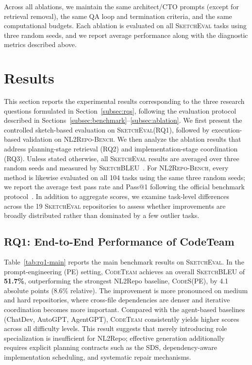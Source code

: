 \documentclass[format=acmsmall, review=false, screen=true]{acmart}
\newcommand{\tool}{\textsc{CodeTeam}\xspace}
\newcommand{\codes}{\textsc{CodeS}\xspace}
\newcommand{\sketcheval}{\textsc{SketchEval}\xspace}
\newcommand{\sketchbleu}{\textsc{SketchBLEU}\xspace}
\newcommand{\nlrepobench}{\textsc{NL2Repo-Bench}\xspace}
\begin{document}
Across all ablations, we maintain the same architect/CTO prompts (except for retrieval removal), the same QA loop and termination criteria, and the same computational budgets. Each ablation is evaluated on all \sketcheval tasks using three random seeds, and we report average performance along with the diagnostic metrics described above.


\section{Results}
\label{sec:results}
This section reports the experimental results corresponding to the three research questions formulated in Section~\ref{subsec:rqs}, following the evaluation protocol described in Sections~\ref{subsec:benchmark}--\ref{subsec:ablation}. We first present the controlled sketch-based evaluation on \sketcheval (RQ1), followed by execution-based validation on \nlrepobench. We then analyze the ablation results that address planning-stage retrieval (RQ2) and implementation-stage coordination (RQ3).
Unless stated otherwise, all \sketcheval results are averaged over three random seeds and measured by \sketchbleu~\cite{Zan2025CodeS}. For \nlrepobench, every method is likewise evaluated on all 104 tasks using the same three random seeds; we report the average test pass rate and Pass@1 following the official benchmark protocol~\cite{Ding2025NL2RepoBench}. In addition to aggregate scores, we examine task-level differences across the 19 \sketcheval repositories to assess whether improvements are broadly distributed rather than dominated by a few outlier tasks.

\subsection{RQ1: End-to-End Performance of CodeTeam}
\label{subsec:rq1}

Table~\ref{tab:rq1-main} reports the main benchmark results on \sketcheval.
In the prompt-engineering (PE) setting, \tool achieves an overall \sketchbleu of \textbf{51.7\%}, outperforming the strongest NL2Repo baseline, \codes (PE), by 4.1 absolute points (8.6\% relative).
The improvement is more pronounced on medium and hard repositories, where cross-file dependencies are denser and iterative coordination becomes more important.
Compared with the agent-based baselines (ChatDev, AutoGPT, AgentGPT), \tool consistently yields higher scores across all difficulty levels. This result suggests that merely introducing role specialization is insufficient for NL2Repo; effective generation additionally requires explicit planning contracts such as the SDS, dependency-aware implementation scheduling, and systematic repair mechanisms.
\end{document}
